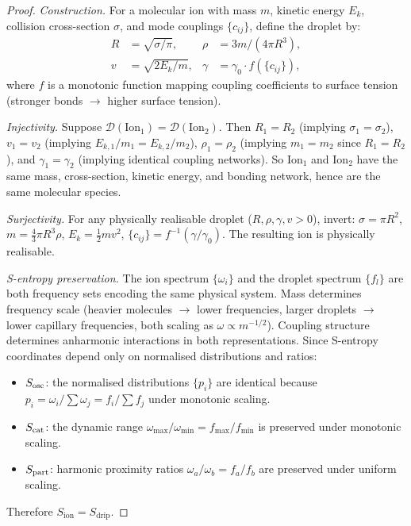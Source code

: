 \begin{proof}
\emph{Construction.}  For a molecular ion with mass $m$, kinetic energy $E_k$,
collision cross-section $\sigma$, and mode couplings $\{c_{ij}\}$, define
the droplet by:
\begin{align*}
  R &= \sqrt{\sigma/\pi}, &
  \rho &= 3m/(4\pi R^3), \\
  v &= \sqrt{2E_k/m}, &
  \gamma &= \gamma_0 \cdot f(\{c_{ij}\}),
\end{align*}
where $f$ is a monotonic function mapping coupling coefficients to surface
tension (stronger bonds $\to$ higher surface tension).

\emph{Injectivity.}  Suppose $\mathcal{D}(\text{Ion}_1) = \mathcal{D}(\text{Ion}_2)$.
Then $R_1 = R_2$ (implying $\sigma_1 = \sigma_2$), $v_1 = v_2$ (implying
$E_{k,1}/m_1 = E_{k,2}/m_2$), $\rho_1 = \rho_2$ (implying $m_1 = m_2$ since
$R_1 = R_2$), and $\gamma_1 = \gamma_2$ (implying identical coupling networks).
So Ion$_1$ and Ion$_2$ have the same mass, cross-section, kinetic energy, and
bonding network, hence are the same molecular species.

\emph{Surjectivity.}  For any physically realisable droplet
($R, \rho, \gamma, v > 0$), invert: $\sigma = \pi R^2$,
$m = \tfrac{4}{3}\pi R^3\rho$, $E_k = \tfrac{1}{2}mv^2$,
$\{c_{ij}\} = f^{-1}(\gamma/\gamma_0)$.  The resulting ion is physically
realisable.

\emph{S-entropy preservation.}  The ion spectrum $\{\omega_i\}$ and the
droplet spectrum $\{f_l\}$ are both frequency sets encoding the same physical
system.  Mass determines frequency scale (heavier molecules $\to$ lower
frequencies, larger droplets $\to$ lower capillary frequencies, both scaling
as $\omega \propto m^{-1/2}$).  Coupling structure determines anharmonic
interactions in both representations.  Since S-entropy coordinates depend only
on normalised distributions and ratios:
\begin{itemize}
  \item $S_{\mathrm{osc}}$: the normalised distributions $\{p_i\}$ are identical because
    $p_i = \omega_i/\sum\omega_j = f_i/\sum f_j$ under monotonic scaling.
  \item $S_{\mathrm{cat}}$: the dynamic range $\omega_{\max}/\omega_{\min} = f_{\max}/f_{\min}$
    is preserved under monotonic scaling.
  \item $S_{\mathrm{part}}$: harmonic proximity ratios $\omega_a/\omega_b = f_a/f_b$
    are preserved under uniform scaling.
\end{itemize}
Therefore $S_{\mathrm{ion}} = S_{\mathrm{drip}}$.
\end{proof}

